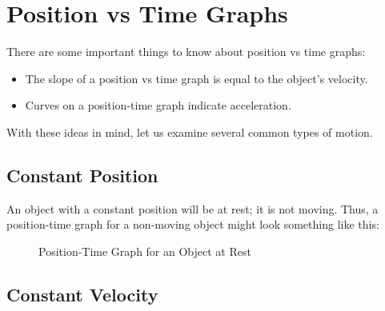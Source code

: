 \newpage
	\section{Position vs Time Graphs}
	There are some important things to know about position vs time graphs:
	\begin{itemize}
		\item The slope of a position vs time graph is equal to the object's velocity. 
		\item Curves on a position-time graph indicate acceleration.
	\end{itemize}
With these ideas in mind, let us examine several common types of motion.  

		\subsection{Constant Position}
		An object with a constant position will be at rest; it is not moving.  Thus, a position-time graph for a non-moving object might look something like this: 
		\begin{figure}[h]
			\centering
			\caption{Position-Time Graph for an Object at Rest}
		\end{figure}
	
		
		\subsection{Constant Velocity}
		

